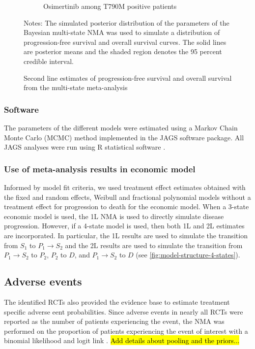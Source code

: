 \documentclass[11pt,final,fleqn]{article}\usepackage[]{graphicx}\usepackage[]{color}
\theoremstyle{plain}
\begin{document}
{\begin{figure}
\begin{subfigure}{\textwidth}
\caption{Osimertinib among T790M positive patients} \label{subfig:surv-2L_t790m-osi}
\end{subfigure}
\caption{Second line estimates of progression-free survival and overall survival from the multi-state meta-analysis}\label{fig:surv-2L}
\begin{minipage}{\linewidth}
\footnotesize
Notes: The simulated posterior distribution of the parameters of the Bayesian multi-state NMA was used to simulate a distribution of progression-free survival and overall survival curves. The solid lines are posterior means and the shaded region denotes the 95 percent credible interval.
\end{minipage}
\end{figure}

\subsubsection{Software}
The parameters of the different models were estimated using a Markov Chain Monte Carlo (MCMC) method implemented in the JAGS software package. All JAGS analyses were run using R statistical software \citep{team2014r}.

\subsubsection{Use of meta-analysis results in economic model}
Informed by model fit criteria, we used treatment effect estimates obtained with the fixed and random effects, Weibull and fractional polynomial models without a treatment effect for progression to death for the economic model.  When a 3-state economic model is used, the 1L NMA is used to directly simulate disease progression. However, if a 4-state model is used, then both 1L and 2L estimates are incorporated. In particular, the 1L results are used to simulate the transition from $S_1$ to $P_1 \rightarrow S_2$ and the 2L results are used to simulate the transition from $P_1 \rightarrow S_2$ to $P_2$, $P_2$ to $D$, and $P_1 \rightarrow S_2$ to $D$ (see \autoref{fig:model-structure-4-states}). 




\subsection{Adverse events}\label{subsec:data-aes}
The identified RCTs also provided the evidence base to estimate treatment specific adverse eent probabilities. Since adverse events in nearly all RCTs were reported as the number of patients experiencing the event, the NMA was performed on the proportion of patients experiencing the event of interest with a binomial likelihood and logit link \citep[Chapter~2]{dias2018network}. \hl{Add details about pooling and the priors...}

}
\end{document}
